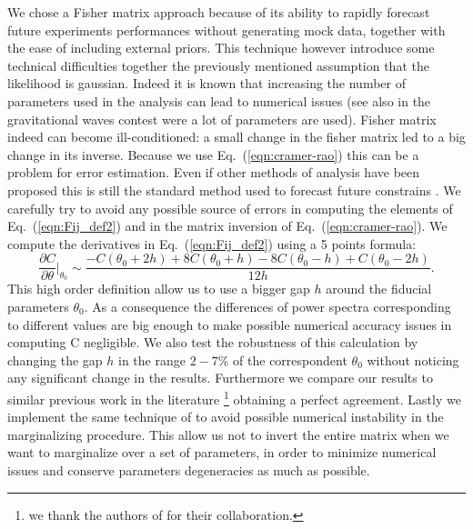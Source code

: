 \documentclass[aps,prd,reprint,superscriptaddress]{revtex4-1}
\newcommand\refeq[1]{Eq.~(\ref{eqn:#1})}
\begin{document}
We chose a Fisher matrix approach because of its ability to rapidly forecast future experiments performances without generating mock data, together with the ease of including external priors. 
This technique however introduce some technical difficulties together the previously mentioned assumption that the likelihood is gaussian. 
Indeed it is known \cite{2006astro.ph..9591A} that increasing the number of parameters used in the analysis can lead to numerical issues (see also \cite{2008PhRvD..77d2001V} in the gravitational waves contest were a lot of parameters are used).
Fisher matrix indeed can become ill-conditioned: a small change in the fisher matrix led to a big change in its inverse. Because we use \refeq{cramer-rao} this can be a problem for error estimation. 
Even if other methods of analysis have been proposed \cite{2006JCAP...10..013P,2006astro.ph..9591A} this is still the standard method used to forecast future constrains \cite{wu:2014}.
We carefully try to avoid any possible source of errors in computing the elements of \refeq{Fij_def2} and in the matrix inversion of \refeq{cramer-rao}.
We compute the derivatives in \refeq{Fij_def2} using a 5 points formula:
\begin{equation}
\frac{\partial C}{\partial \theta}\bigg|_{\theta_{0}} \sim \frac{-C(\theta_{0}+2h)+8C(\theta_{0}+h)-8C(\theta_{0}-h)+C(\theta_{0}-2h)}{12h}.
\label{eqn:deriv}
\end{equation}
This high order definition allow us to use a bigger gap $h$ around the fiducial parameters $\theta_{0}$. As a consequence the differences of power spectra corresponding to different values are big enough to make possible numerical accuracy issues in computing C negligible.
We also test the robustness of this calculation by changing the gap $h$ in the range $2-7\%$ of the correspondent $\theta_{0}$ without noticing any significant change in the results.
Furthermore we compare our results to similar previous work in the literature \footnote{we thank the authors of \cite{pan:2015} for their collaboration.} obtaining a perfect agreement.
Lastly we implement the same technique of \cite{2006astro.ph..9591A} to avoid possible numerical instability in the marginalizing procedure. This allow us not to invert the entire matrix when we want to marginalize over a set of parameters, in order to minimize numerical issues and conserve parameters degeneracies as much as possible.
\end{document}
